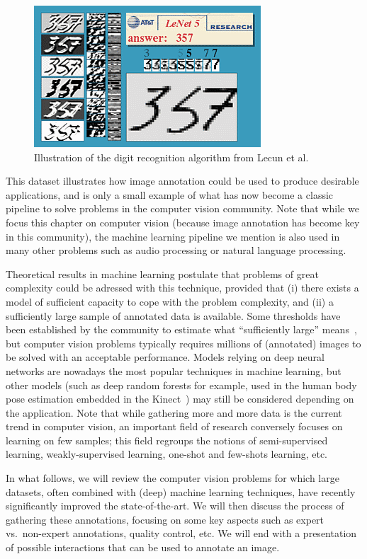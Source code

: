 \begin{figure}[ht]
\centering
\includegraphics[width=0.5\columnwidth]{assets/img/lenet-results.png}
\caption{Illustration of the digit recognition algorithm from Lecun et al.\ \cite{lecun1998gradient}}%
\label{fig:lenet}
\end{figure}

This dataset illustrates how image annotation could be used
to produce desirable applications, and is only a small example of what
has now become a classic pipeline to solve problems in the computer vision community.
Note that while we focus this chapter on computer vision
(because image annotation has become key in this community),
the machine learning pipeline we mention is also used in many other problems
such as audio processing or natural language processing.

Theoretical results in machine learning postulate that
problems of great complexity could be adressed with this technique,
provided that (i) there exists a model of sufficient capacity
to cope with the problem complexity,
and (ii) a sufficiently large sample of annotated data is available.
Some thresholds have been established by the community to estimate
what ``sufficiently large'' means~\cite{raudys1991small, jain198239},
but computer vision problems typically requires millions
of (annotated) images to be solved with an acceptable performance.
Models relying on deep neural networks are nowadays
the most popular techniques in machine learning,
but other models (such as deep random forests for example,
used in the human body pose estimation embedded in the Kinect~\cite{shotton2011real})
may still be considered depending on the application.
Note that while gathering more and more data is the current trend in computer vision,
an important field of research conversely focuses on learning on few samples;
this field regroups the notions of semi-supervised learning,
weakly-supervised learning, one-shot and few-shots learning, etc.

In what follows, we will review the computer vision problems for which large datasets,
often combined with (deep) machine learning techniques,
have recently significantly improved the state-of-the-art.
We will then discuss the process of gathering these annotations,
focusing on some key aspects such as expert vs.\ non-expert annotations, quality control, etc.
We will end with a presentation of possible interactions that can be used to annotate an image.

